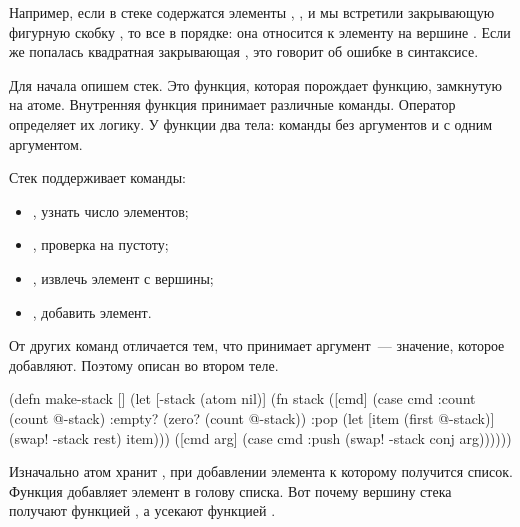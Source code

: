 Например, если в стеке содержатся элементы \code{(}, \code{[}, \code{\{} и мы встретили закрывающую фигурную скобку \code{\}}, то все в порядке: она относится к элементу на вершине \code{\{}. Если же попалась квадратная закрывающая \code{]}, это говорит об ошибке в синтаксисе.

\begin{english}
  \begin{text}
"(..[..{..}......" ;; ok
          ^

"(..[..{..]......" ;; error
          ^
  \end{text}
\end{english}

Для начала опишем стек. Это функция, которая порождает функцию, замкнутую на атоме. Внутренняя функция принимает различные команды. Оператор  определяет их логику. У функции два тела: команды без аргументов и с одним аргументом.

Стек поддерживает команды:

\begin{itemize}

\item
  , узнать число элементов;

\item
  , проверка на пустоту;

\item
  , извлечь элемент с вершины;

\item
  , добавить элемент.

\end{itemize}

От других команд  отличается тем, что принимает аргумент~--- значение, которое добавляют. Поэтому  описан во втором теле.

\begin{english}
  \begin{clojure/lines}
(defn make-stack []
  (let [-stack (atom nil)]
    (fn stack
      ([cmd]
       (case cmd
         :count (count @-stack)
         :empty? (zero? (count @-stack))
         :pop (let [item (first @-stack)]
                (swap! -stack rest)
                item)))
      ([cmd arg]
       (case cmd
         :push
         (swap! -stack conj arg))))))
  \end{clojure/lines}
\end{english}

Изначально атом хранит , при добавлении элемента к которому получится список. Функция  добавляет элемент в голову списка. Вот почему вершину стека получают функцией , а усекают функцией  .

